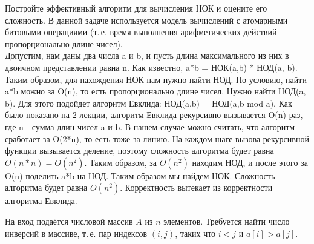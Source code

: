 \documentclass[12pt]{extreport}
\theoremstyle{definiton}
\theoremstyle{definition}
\theoremstyle{definition}
\def\prend{
	\medskip
}
\begin{document}
\PR[3][ДПВ 1.33] Постройте эффективный алгоритм для вычисления НОК и оцените его сложность. В данной задаче используется модель вычислений с атомарными битовыми операциями (т.\,е. время выполнения арифметических действий пропорционально длине чисел).          
\newline
\\ Допустим, нам даны два числа a и b, и пусть длина максимального из них в двоичном представлении равна n. Как известно, a*b = НОК(a,b) * НОД(a, b). Таким образом, для нахождения НОК нам нужно найти НОД. По условию, найти a*b можно за O(n), то есть пропорционально длине чисел. Нужно найти НОД(a, b). Для этого подойдет алгоритм Евклида: НОД(a,b) = НОД(a,b mod a). Как было показано на 2 лекции, алгоритм Евклида рекурсивно вызывается O(n) раз, где n - сумма длин чисел a и b. В нашем случае можно считать, что алгоритм сработает за O(2*n), то есть тоже за линию. На каждом шаге вызова рекурсивной функции вызывается деление, поэтому сложность алгоритма будет равна $O(n*n)=O(n^2)$. Таким образом, за $O(n^2)$ находим НОД, и после этого за O(n) поделить a*b на НОД. Таким образом мы найдем НОК. Сложность алгоритма будет равна $O(n^2)$. Корректность вытекает из корректности алгоритма Евклида.

	\prend
       
                   
\PR[3] На вход подаётся числовой массив $A$ из $n$ элементов. Требуется найти число инверсий в массиве, т.\,е. пар индексов $(i,j)$, таких что $i<j$ и $a[i] > a[j]$.

\smallskip
\end{document}
